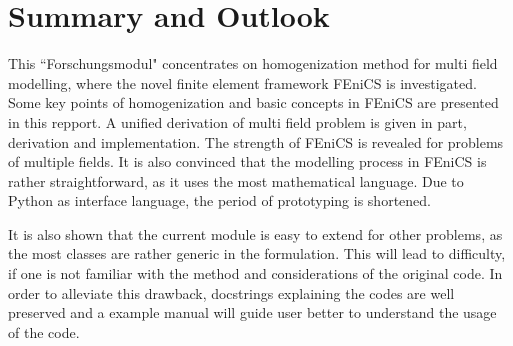 %
%
%
%
%
%

\chapter{Summary and Outlook}
This ``Forschungsmodul" concentrates on homogenization method for multi field modelling, where the novel finite element framework FEniCS is investigated. Some key points of homogenization and basic concepts in FEniCS are presented in this repport. A unified derivation of multi field problem is given in part, derivation and implementation. The strength of FEniCS is revealed for problems of multiple fields. It is also convinced that the modelling process in FEniCS is rather straightforward, as it uses the most mathematical language. Due to Python as interface language, the period of prototyping is shortened.

It is also shown that the current module is easy to extend for other problems, as the most classes are rather generic in the formulation. This will lead to difficulty, if one is not familiar with the method and considerations of the original code. In order to alleviate this drawback, docstrings explaining the codes are well preserved and a example manual will guide user better to understand the usage of the code.

